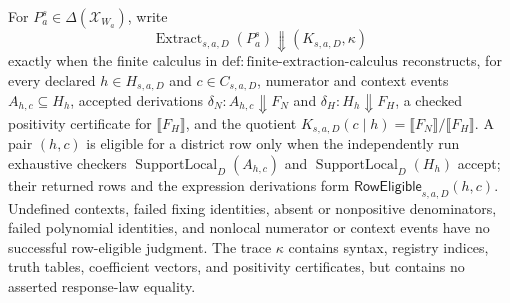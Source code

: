 For \(P_a^s\in\Delta(\mathcal X_{W_a})\), write
\[
\operatorname{Extract}_{s,a,D}(P_a^s)\Downarrow(K_{s,a,D},\kappa)
\]
exactly when the finite calculus in \(\mathrm{def:finite\text{-}extraction\text{-}calculus}\) reconstructs, for every declared \(h\in H_{s,a,D}\) and \(c\in C_{s,a,D}\), numerator and context events \(A_{h,c}\subseteq H_h\), accepted derivations \(\delta_N:A_{h,c}\Downarrow F_N\) and \(\delta_H:H_h\Downarrow F_H\), a checked positivity certificate for \(\llbracket F_H\rrbracket\), and the quotient \(K_{s,a,D}(c\mid h)=\llbracket F_N\rrbracket/\llbracket F_H\rrbracket\).  A pair \((h,c)\) is eligible for a district row only when the independently run exhaustive checkers \(\operatorname{SupportLocal}_D(A_{h,c})\) and \(\operatorname{SupportLocal}_D(H_h)\) accept; their returned rows and the expression derivations form \(\mathsf{RowEligible}_{s,a,D}(h,c)\).  Undefined contexts, failed fixing identities, absent or nonpositive denominators, failed polynomial identities, and nonlocal numerator or context events have no successful row-eligible judgment.  The trace \(\kappa\) contains syntax, registry indices, truth tables, coefficient vectors, and positivity certificates, but contains no asserted response-law equality.